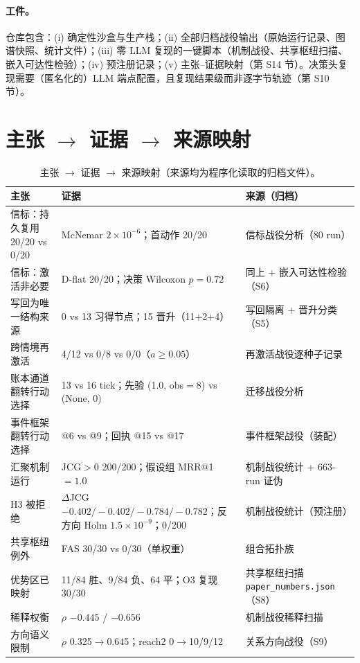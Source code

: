 \documentclass[10pt,a4paper]{ctexart}
\begin{document}
\paragraph{工件。}仓库包含：(i) 确定性沙盒与生产栈；(ii) 全部归档战役输出（原始运行记录、图谱快照、统计文件）；(iii) 零 LLM 复现的一键脚本（机制战役、共享枢纽扫描、嵌入可达性检验）；(iv) 预注册记录；(v) 主张--证据映射（第 S14 节）。决策头复现需要（匿名化的）LLM 端点配置，且复现结果级而非逐字节轨迹（第 S10 节）。

\section{主张 $\rightarrow$ 证据 $\rightarrow$ 来源映射}
\label{s14:claims}

\begin{table}[h]
\centering\small
\caption{主张 $\rightarrow$ 证据 $\rightarrow$ 来源映射（来源均为程序化读取的归档文件）。}
\label{tab:s-claims}
\begin{tabular}{L{4.6cm}L{4.6cm}L{5.6cm}}
\toprule
\textbf{主张} & \textbf{证据} & \textbf{来源（归档）} \\
\midrule
信标：持久复用 20/20 vs 0/20 & McNemar $2\times10^{-6}$；首动作 20/20 & 信标战役分析（80 run） \\
信标：激活非必要 & D-flat 20/20；决策 Wilcoxon $p{=}0.72$ & 同上 + 嵌入可达性检验（S6） \\
写回为唯一结构来源 & 0 vs 13 习得节点；15 晋升（11+2+4） & 写回隔离 + 晋升分类（S5） \\
跨情境再激活 & 4/12 vs 0/8 vs 0/0（$a\ge0.05$） & 再激活战役逐种子记录 \\
账本通道翻转行动选择 & 13 vs 16 tick；先验 (1.0, obs$=$8) vs (None, 0) & 迁移战役分析 \\
事件框架翻转行动选择 & @6 vs @9；回执 @15 vs @17 & 事件框架战役（装配） \\
汇聚机制运行 & JCG$>0$ 200/200；假设组 MRR@1$=1.0$ & 机制战役统计 + 663-run 证伪 \\
H3 被拒绝 & $\Delta$JCG $-0.402/-0.402/-0.784/-0.782$；反方向 Holm $1.5\times10^{-9}$；0/200 & 机制战役统计（预注册） \\
共享枢纽例外 & FAS 30/30 vs 0/30（单权重） & 组合拓扑族 \\
优势区已映射 & 11/84 胜、9/84 负、64 平；O3 复现 30/30 & 共享枢纽扫描 \texttt{paper\_numbers.json}（S8） \\
稀释权衡 & $\rho$ $-0.445$ / $-0.656$ & 机制战役稀释扫描 \\
方向语义限制 & $\rho$ 0.325$\rightarrow$0.645；reach2 0$\rightarrow$10/9/12 & 关系方向战役（S9） \\

\end{tabular}
\end{table}
\end{document}
